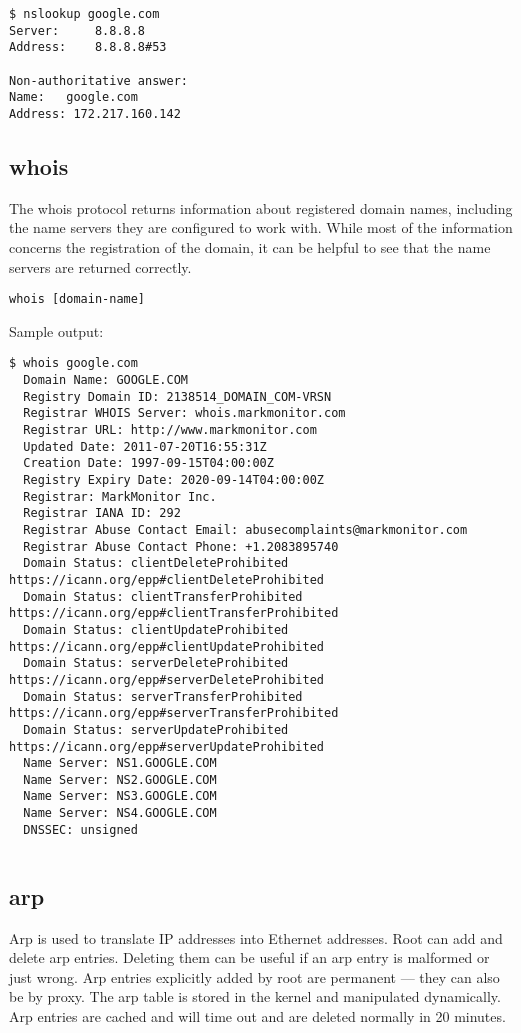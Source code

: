 \documentclass[a4paper,12pt]{article}
\begin{document}
\begin{verbatim}
$ nslookup google.com
Server:		8.8.8.8
Address:	8.8.8.8#53

Non-authoritative answer:
Name:	google.com
Address: 172.217.160.142
\end{verbatim}

\subsection{whois}
The whois protocol returns information about registered domain names, including the name servers they are configured to work with.
While most of the information concerns the registration of the domain, it can be helpful to see that the name servers are returned correctly.


\begin{verbatim}
whois [domain-name]
\end{verbatim}

Sample output:

\begin{verbatim}
$ whois google.com
  Domain Name: GOOGLE.COM
  Registry Domain ID: 2138514_DOMAIN_COM-VRSN
  Registrar WHOIS Server: whois.markmonitor.com
  Registrar URL: http://www.markmonitor.com
  Updated Date: 2011-07-20T16:55:31Z
  Creation Date: 1997-09-15T04:00:00Z
  Registry Expiry Date: 2020-09-14T04:00:00Z
  Registrar: MarkMonitor Inc.
  Registrar IANA ID: 292
  Registrar Abuse Contact Email: abusecomplaints@markmonitor.com
  Registrar Abuse Contact Phone: +1.2083895740
  Domain Status: clientDeleteProhibited https://icann.org/epp#clientDeleteProhibited
  Domain Status: clientTransferProhibited https://icann.org/epp#clientTransferProhibited
  Domain Status: clientUpdateProhibited https://icann.org/epp#clientUpdateProhibited
  Domain Status: serverDeleteProhibited https://icann.org/epp#serverDeleteProhibited
  Domain Status: serverTransferProhibited https://icann.org/epp#serverTransferProhibited
  Domain Status: serverUpdateProhibited https://icann.org/epp#serverUpdateProhibited
  Name Server: NS1.GOOGLE.COM
  Name Server: NS2.GOOGLE.COM
  Name Server: NS3.GOOGLE.COM
  Name Server: NS4.GOOGLE.COM
  DNSSEC: unsigned
\end{verbatim}

\begin{verbatim}

\end{verbatim}

\subsection{arp}
Arp is used to translate IP addresses into Ethernet addresses.
Root can add and delete arp entries. Deleting them can be useful if an arp entry is malformed or
 just wrong. Arp entries explicitly added by root are permanent — they can also be by proxy.
 The arp table is stored in the kernel and manipulated dynamically. Arp entries are cached and
 will time out and are deleted normally in 20 minutes.
\end{document}
